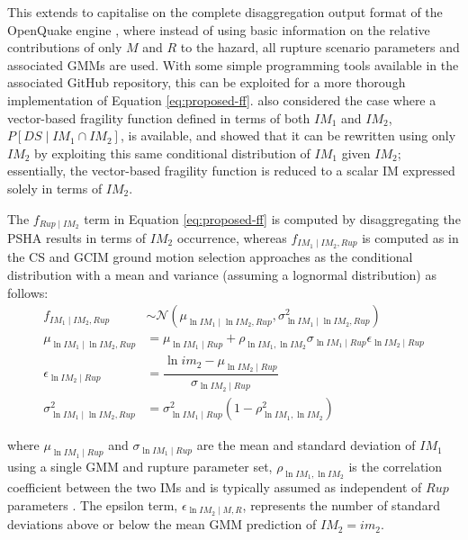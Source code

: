 This extends \citet{Suzuki2020} to capitalise on the complete disaggregation output format of the OpenQuake engine \citep{pagani2014}, where instead of using basic information on the relative contributions of only $M$ and $R$ to the hazard, all rupture scenario parameters and associated \acp{GMM} are used. With some simple programming tools available in the associated GitHub repository, this can be exploited for a more thorough implementation of Equation \eqref{eq:proposed-ff}. \citet{Suzuki2020} also considered the case where a vector-based fragility function defined in terms of both $IM_1$ and $IM_2$, $P[DS \mid IM_1 \cap IM_2]$, is available, and showed that it can be rewritten using only $IM_2$ by exploiting this same conditional distribution of $IM_1$ given $IM_2$; essentially, the vector-based fragility function is reduced to a scalar \ac{IM} expressed solely in terms of $IM_2$.

The $f_{Rup\mid  IM_2}$ term in Equation \eqref{eq:proposed-ff} is computed by disaggregating the \ac{PSHA} results in terms of $IM_2$ occurrence, whereas $f_{IM_1 \mid IM_2, Rup}$ is computed as in the \ac{CS} and \ac{GCIM} ground motion selection approaches as the conditional distribution  with a mean and variance (assuming a lognormal distribution) as follows:
\begin{align}
    f_{IM_1\mid  IM_2, Rup} &\sim \mathcal{N}\left(\mu_{\ln{IM_1}\mid \ln{IM_2}, Rup} , \sigma^2_{\ln{IM_1}\mid \ln{IM_2}, Rup} \right) \label{eq:f_im1_im2}\\
    \mu_{\ln{IM_1}\mid \ln{IM_2}, Rup} &= \mu_{\ln{IM_1}\mid Rup} + \rho_{\ln{IM_1},\ln{IM_2}}\sigma_{\ln{IM_1}\mid Rup}\epsilon_{\ln{IM_2}\mid Rup}  \label{eq:mu_im1_im2} \\
    \epsilon_{\ln{IM_2}\mid Rup} &= \dfrac{\ln{im_2} - \mu_{\ln{IM_2}\mid Rup}}{\sigma_{\ln{IM_2}\mid Rup}} \label{eq:epsilon_im2}\\
    \sigma^2_{\ln{IM_1}\mid \ln{IM_2}, Rup} &= \sigma^2_{\ln{IM_1}\mid Rup}\left(1-\rho^2_{\ln{IM_1},\ln{IM_2}}\right) \label{eq:sigma2_im1_im2}
\end{align}

\noindent where $\mu_{\ln{IM_1}\mid Rup}$ and $\sigma_{\ln{IM_1}\mid Rup}$ are the mean and standard deviation of $IM_1$ using a single \ac{GMM} and rupture parameter set, $\rho_{\ln{IM_1},\ln{IM_2}}$ is the correlation coefficient between the two \acp{IM} and is typically assumed as independent of $Rup$ parameters \citep[e.g.,][]{Baker2017, Aristeidou2025}. The epsilon term, $\epsilon_{\ln{IM_2}\mid M,R}$, represents the number of standard deviations above or below the mean \ac{GMM} prediction of $IM_2=im_2$.

